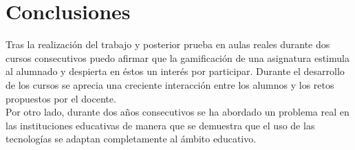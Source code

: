 \setcounter{chapter}{9}
\setcounter{section}{0}
\setcounter{subsection}{0}
\chapter{Conclusiones}

Tras la realización del trabajo y posterior prueba en aulas reales durante dos cursos consecutivos puedo afirmar que la gamificación de una asignatura estimula al alumnado y despierta en éstos un interés por participar. Durante el desarrollo de los cursos se aprecia una creciente interacción entre los alumnos y los retos propuestos por el docente.\\

Por otro lado, durante dos años consecutivos se ha abordado un problema real en las instituciones educativas de manera que se demuestra que el uso de las tecnologías se adaptan completamente al ámbito educativo.